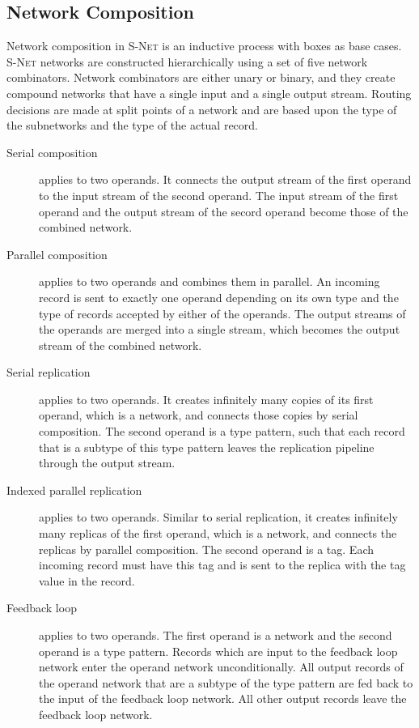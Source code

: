     \subsection*{Network Composition}
Network composition in \textsc{S-Net} is an inductive process with boxes as base cases. \textsc{S-Net} networks are constructed hierarchically using a set of five network combinators. Network combinators are either unary or binary, and they create compound networks that have a single input and a single output stream. Routing decisions are made at split points of a network and are based upon the type of the subnetworks and the type of the actual record.

    \begin{description}
    \item[Serial composition] applies to two operands. It connects the output stream of the first operand to the input stream of the second operand. The input stream of the first operand and the output stream of the secord operand become those of the combined network.

    \item[Parallel composition] applies to two operands and combines them in parallel. An incoming record is sent to exactly one operand depending on its own type and the type of records accepted by either of the operands. The output streams of the operands are merged into a single stream, which becomes the output stream of the combined network.

    \item[Serial replication] applies to two operands. It creates infinitely many copies of its first operand, which is a network, and connects those copies by serial composition. The second operand is a type pattern, such that each record that is a subtype of this type pattern leaves the replication pipeline through the output stream.

    \item[Indexed parallel replication] applies to two operands. Similar to serial replication, it creates infinitely many replicas of the first operand, which is a network, and connects the replicas by parallel composition. The second operand is a tag. Each incoming record must have this tag and is sent to the replica with the tag value in the record.

    \item[Feedback loop] applies to two operands. The first operand is a network and the second operand is a type pattern. Records which are input to the feedback loop network enter the operand network unconditionally. All output records of the operand network that are a subtype of the type pattern are fed back to the input of the feedback loop network. All other output records leave the feedback loop network.

    \end{description}

